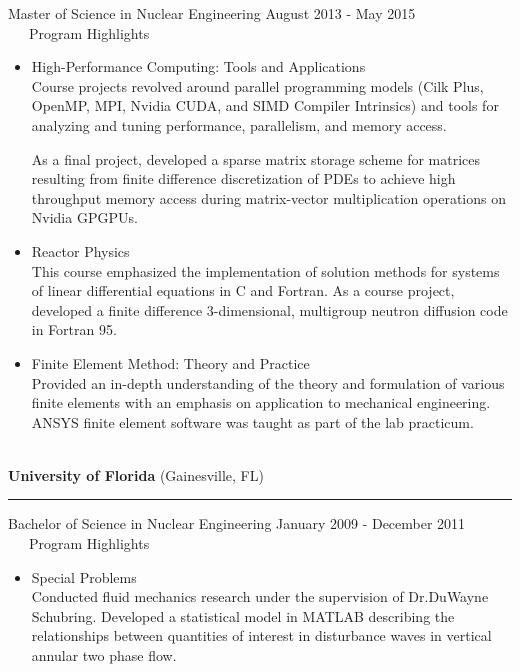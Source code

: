 \documentclass[legalpaper]{article}
\begin{document}
Master of Science in Nuclear Engineering \hfill August 2013 - May 2015\\
\vspace{\baselineskip} %
~~~Program Highlights
\begin{itemize}[topsep=0pt, before={\vspace*{-0.5\baselineskip}}]%
\item High-Performance Computing: Tools and Applications\\
  Course projects revolved around parallel programming models (Cilk Plus, OpenMP, MPI, Nvidia CUDA, and SIMD Compiler Intrinsics) and tools for analyzing and tuning performance, parallelism, and memory access.

  As a final project, developed a sparse matrix storage scheme for matrices resulting from finite difference discretization of PDEs to achieve high throughput memory access during matrix-vector multiplication operations on Nvidia GPGPUs.

\item Reactor Physics\\
  This course emphasized the implementation of solution methods for systems of linear differential equations in C and Fortran.
  As a course project, developed a finite difference 3-dimensional, multigroup neutron diffusion code in Fortran 95.

\item Finite Element Method: Theory and Practice\\
  Provided an in-depth understanding of the theory and formulation of various finite elements with an emphasis on application to mechanical engineering.
  ANSYS finite element software was taught as part of the lab practicum.

\end{itemize}
~\\
\textbf{University of Florida} (Gainesville, FL) \hrule \vspace{1mm}
Bachelor of Science in Nuclear Engineering \hfill January 2009 - December 2011\\
\vspace{\baselineskip} %
~~~Program Highlights
\begin{itemize}[topsep=0pt, before={\vspace*{-0.5\baselineskip}}]%
\item Special Problems\\
  Conducted fluid mechanics research under the supervision of Dr.\@ DuWayne Schubring.
  Developed a statistical model in MATLAB describing the relationships between quantities of interest in disturbance waves in vertical annular two phase flow.
\end{itemize}
\end{document}
